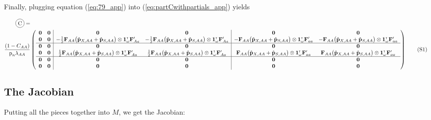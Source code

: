 \documentclass[11pt]{article}
\newcommand*\circled[1]{\tikz[baseline=(char.base)]{
            \node[shape=circle,draw,inner sep=2pt] (char) {#1};}}
\newcommand\numberthis{\addtocounter{equation}{1}\tag{\theequation}}
\def\mbf#1{\mathbf{#1}}
\newcommand{\tr}{{\mbox{\tiny \sf T}}}
\begin{document}
\begin{landscape}
Finally, plugging equation (\ref{eq:79_app}) into (\ref{eq:partCwithpartials_app}) yields

{
\scriptsize
\begin{align*}
	\circled{C} =& \\
	\frac{(1 - C_{AA})}{\mbox{p}_{n}\lambda_{AA}} &\left(
			\begin{array}{cc|cc|cc}
					\mbf{0} & \mbf{0} & \mbf{0} & \mbf{0} & \mbf{0} & \mbf{0}  \\
				\mbf{0}   &  	\mbf{0}  & -\frac{1}{2} \mbf{F}_{AA} \big(\hat{\mbf{p}}_{X,AA}+ \hat{\mbf{p}}_{S,AA}  \big) \otimes \mathbf{1}^\tr_{\omega} \mathbf{F}_{Aa}^\prime& -\frac{1}{2} \mbf{F}_{AA} \big(\hat{\mbf{p}}_{X,AA}+ \hat{\mbf{p}}_{S,AA}  \big) \otimes \mathbf{1}^\tr_{\omega} \mathbf{F}_{Aa}^\prime & - \mbf{F}_{AA} \big(\hat{\mbf{p}}_{X,AA}+ \hat{\mbf{p}}_{S,AA}  \big) \otimes \mathbf{1}^\tr_{\omega} \mathbf{F}_{aa}^\prime&  - \mbf{F}_{AA} \big(\hat{\mbf{p}}_{X,AA}+ \hat{\mbf{p}}_{S,AA}  \big) \otimes \mathbf{1}^\tr_{\omega} \mathbf{F}_{aa}^\prime \\ \hline
				\mbf{0} & \mbf{0} & \mbf{0} & \mbf{0} & \mbf{0} & \mbf{0} \\
					\mbf{0}   &  	\mbf{0}  & \frac{1}{2} \mbf{F}_{AA} \big(\hat{\mbf{p}}_{X,AA}+ \hat{\mbf{p}}_{S,AA}  \big) \otimes \mathbf{1}^\tr_{\omega} \mathbf{F}_{Aa}^\prime& \frac{1}{2} \mbf{F}_{AA} \big(\hat{\mbf{p}}_{X,AA}+ \hat{\mbf{p}}_{S,AA}  \big) \otimes \mathbf{1}^\tr_{\omega} \mathbf{F}_{Aa}^\prime &  \mbf{F}_{AA} \big(\hat{\mbf{p}}_{X,AA}+ \hat{\mbf{p}}_{S,AA}  \big) \otimes \mathbf{1}^\tr_{\omega} \mathbf{F}_{aa}^\prime&  \mbf{F}_{AA} \big(\hat{\mbf{p}}_{X,AA}+ \hat{\mbf{p}}_{S,AA}  \big) \otimes \mathbf{1}^\tr_{\omega} \mathbf{F}_{aa}^\prime \\  \hline
				\mbf{0} & \mbf{0} & \mbf{0} & \mbf{0} & \mbf{0} & \mbf{0} \\ 
				\mbf{0} & \mbf{0} & \mbf{0} & \mbf{0} & \mbf{0} & \mbf{0} 
			\end{array} \right)  \numberthis			
\end{align*}
}

\subsection{The Jacobian}

Putting all the pieces together into $M$, we get the Jacobian:


\end{landscape}
\end{document}
